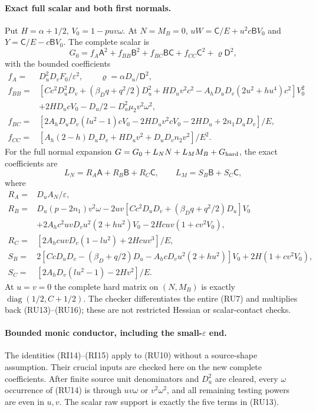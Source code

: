 \paragraph{Exact full scalar and both first normals.}
Put $H=\alpha+1/2$, $V_0=1-puv\omega$. At $N=M_B=0$,
$uW=\mathsf C/E+u^2c\mathsf BV_0$ and
$Y=\mathsf C/E-c\mathsf BV_0$. The complete scalar is
\[
 G_0=f_A\mathsf A^2+f_{BB}\mathsf B^2+
       f_{BC}\mathsf B\mathsf C+f_{CC}\mathsf C^2+
       \varrho\mathsf D^2,                                      \tag{RU13}
\]
with the bounded coefficients
\[
\begin{aligned}
 f_A={}&D_u^2D_vF_0/\varepsilon^2,\qquad
 \varrho=\alpha D_u/\mathsf D^2,\\
 f_{BB}={}&[Cc^2D_u^2D_v+(\beta_Dq+q^2/2)D_u^2+HD_uv^2c^2
             -A_hD_uD_v(2u^2+hu^4)c^2]V_0^2\\
          &+2HD_ucV_0-D_u/2-D_u^2\mu_2v^2\omega^2,\\
 f_{BC}={}&[2A_hD_uD_v(lu^2-1)cV_0-2HD_uv^2cV_0
                   -2HD_u+2n_1D_uD_v]/E,\\
 f_{CC}={}&[A_h(2-h)D_uD_v+HD_uv^2+D_uD_vn_2v^2]/E^2.
\end{aligned}                                                     \tag{RU14}
\]
For the full normal expansion
$G=G_0+L_NN+L_MM_B+G_{\rm hard}$, the exact coefficients are
\[
 L_N=R_A\mathsf A+R_B\mathsf B+R_C\mathsf C,
 \qquad L_M=S_B\mathsf B+S_C\mathsf C,                           \tag{RU15}
\]
where
\[
\begin{aligned}
 R_A={}&D_uA_N/\varepsilon,\\
 R_B={}&D_u(p-2n_1)v^2\omega
 -2uv[Cc^2D_uD_v+(\beta_Dq+q^2/2)D_u]V_0\\
 &+2A_hc^2uvD_vu^2(2+hu^2)V_0-2Hcuv(1+cv^2V_0),\\
 R_C={}&[2A_hcuvD_v(1-lu^2)+2Hcuv^3]/E,\\
 S_B={}&2[CcD_uD_v-(\beta_D+q/2)D_u
                      -A_hcD_vu^2(2+hu^2)]V_0
                         +2H(1+cv^2V_0),\\
 S_C={}&[2A_hD_v(lu^2-1)-2Hv^2]/E.
\end{aligned}                                                     \tag{RU16}
\]
At $u=v=0$ the complete hard matrix on $(N,M_B)$ is exactly
$\operatorname{diag}(1/2,C+1/2)$. The checker differentiates the
entire (RU7) and multiplies back (RU13)--(RU16); these are not
restricted Hessian or scalar-contact checks.

\paragraph{Bounded monic conductor, including the small-$\varepsilon$ end.}
The identities (RI14)--(RI15) apply to (RU10) without a source-shape
assumption. Their crucial inputs are checked here on the new complete
coefficients. After finite source unit denominators and $D_u^2$ are
cleared, every $\omega$ occurrence of (RU14) is through $uv\omega$
or $v^2\omega^2$, and all remaining testing powers are even in $u,v$.
The scalar raw support is exactly the five terms in (RU13).

